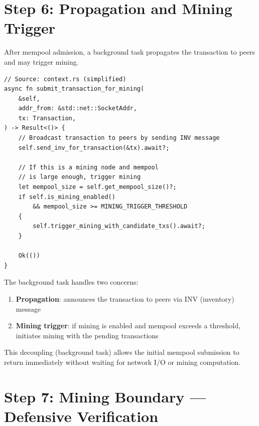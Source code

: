 \section{Step 6: Propagation and Mining Trigger}
\label{sec:ch09-5-step6}

After mempool admission, a background task propagates the transaction to peers and may trigger mining.

\begin{listing}[htbp]
\caption{Background task: submit for mining and relay}
\label{lst:ch09-5-7}
\begin{verbatim}
// Source: context.rs (simplified)
async fn submit_transaction_for_mining(
    &self,
    addr_from: &std::net::SocketAddr,
    tx: Transaction,
) -> Result<()> {
    // Broadcast transaction to peers by sending INV message
    self.send_inv_for_transaction(&tx).await?;

    // If this is a mining node and mempool
    // is large enough, trigger mining
    let mempool_size = self.get_mempool_size()?;
    if self.is_mining_enabled()
        && mempool_size >= MINING_TRIGGER_THRESHOLD
    {
        self.trigger_mining_with_candidate_txs().await?;
    }

    Ok(())
}
\end{verbatim}
\end{listing}

\begin{notebox}
The background task handles two concerns:
\begin{enumerate}
  \item \textbf{Propagation}: announces the transaction to peers via INV (inventory) message
  \item \textbf{Mining trigger}: if mining is enabled and mempool exceeds a threshold, initiates mining with the pending transactions
\end{enumerate}

This decoupling (background task) allows the initial mempool submission to return immediately without waiting for network I/O or mining computation.
\end{notebox}

\needspace{3in}
\section{Step 7: Mining Boundary --- Defensive Verification}
\label{sec:ch09-5-step7}

